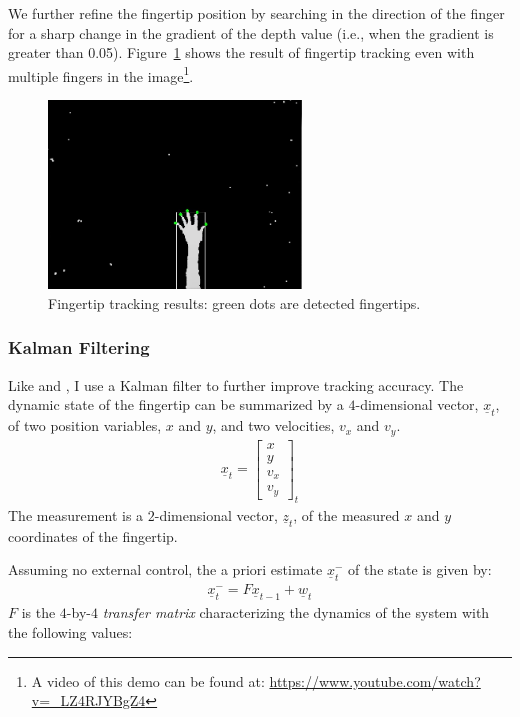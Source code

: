 We further refine the fingertip position by searching in the direction of the
finger for a sharp change in the gradient of the depth value (i.e., when
the gradient is greater than 0.05). Figure~\ref{fig:five-finger} shows the
result of fingertip tracking even with multiple fingers in the image\footnote{A
video of this demo can be found at: \url{https://www.youtube.com/watch?v=_LZ4RJYBgZ4}}.

\begin{figure}[tbh]
\centering
\includegraphics[width=0.6\textwidth]{figures/five_fingers.PNG}
\caption{Fingertip tracking results: green dots are detected fingertips.}
\label{fig:five-finger}
\end{figure}

\subsubsection{Kalman Filtering}
Like \cite{Oka02} and \cite{harrison11}, I use a Kalman filter
to further improve tracking accuracy.
The dynamic state of the fingertip can be summarized by a $4$-dimensional vector,
$\underline{x}_t$, of two position variables, $x$ and $y$, and two velocities,
$v_x$ and $v_y$. 
\begin{align*}
\underline{x}_t = \begin{bmatrix}
  x   \\
  y   \\
  v_x \\
  v_y \end{bmatrix}_t
\end{align*}
The measurement is a $2$-dimensional vector, $\underline{z}_t$,
of the measured $x$ and $y$ coordinates of the fingertip.

Assuming no external control, the a priori estimate $\underline{x}_t^-$ of the
state is given by:
\begin{align*}
\underline{x}_t^- = F\underline{x}_{t - 1} + \underline{w}_t
\end{align*}
$F$ is the $4$-by-$4$ \textit{transfer matrix} characterizing the
dynamics of the system with the following values:

